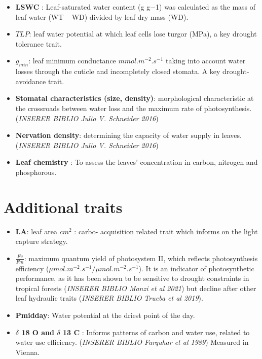 \documentclass[
]{book}
\providecommand{\tightlist}{%
  \setlength{\itemsep}{0pt}\setlength{\parskip}{0pt}}
\begin{document}
\begin{itemize}
\tightlist
\item
  \textbf{LSWC} : Leaf-saturated water content (g g−1) was calculated as the mass of leaf water (WT -- WD) divided by leaf dry mass (WD).
\item
  \textbf{\(TLP\)}: leaf water potential at which leaf cells lose turgor (MPa), a key drought tolerance trait.
\item
  \textbf{\(g_{min}\)}: leaf minimum conductance \(mmol.m^{-2}.s^{-1}\) taking into account water losses through the cuticle and incompletely closed stomata. A key drought-avoidance trait.
\item
  \textbf{Stomatal characteristics (size, density)}: morphological characteristic at the crossroads between water loss and the maximum rate of photosynthesis.(\emph{INSERER BIBLIO Julio V. Schneider 2016})
\item
  \textbf{Nervation density}: determining the capacity of water supply in leaves. (\emph{INSERER BIBLIO Julio V. Schneider 2016})
\item
  \textbf{Leaf chemistry} : To assess the leaves' concentration in carbon, nitrogen and phosphorous.
\end{itemize}

\hypertarget{additional-traits}{%
\section{Additional traits}\label{additional-traits}}

\begin{itemize}
\item
  \textbf{LA}: leaf area \(cm^{2}\) : carbo- acquisition related trait which informs on the light capture strategy.
\item
  \textbf{\(\frac{Fv}{Fm}\)}: maximum quantum yield of photosystem II, which reflects photosynthesis efficiency (\(\mu mol . m^{-2} . s^{-1}/ \mu mol . m^{-2} . s^{-1}\)). It is an indicator of photosynthetic performance, as it has been shown to be sensitive to drought constraints in tropical forests (\emph{INSERER BIBLIO Manzi et al 2021}) but decline after other leaf hydraulic traits (\emph{INSERER BIBLIO Trueba et al 2019}).
\item
  \textbf{Pmidday}: Water potential at the driest point of the day.
\item
  \textbf{\(\delta\) 18 O and \(\delta\) 13 C} : Informs patterns of carbon and water use, related to water use efficiency. (\emph{INSERER BIBLIO Farquhar et al 1989}) Measured in Vienna.
\end{itemize}
\end{document}
